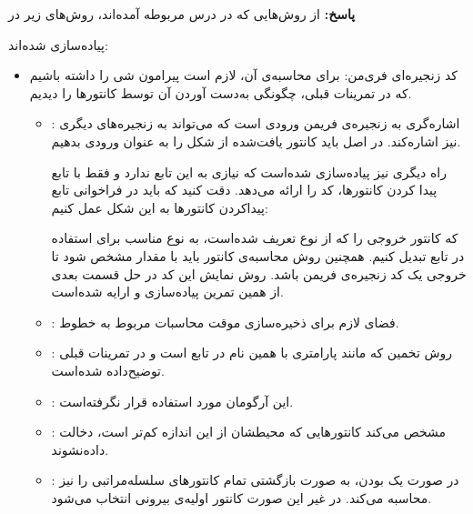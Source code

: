 \documentclass[12pt,a4paper]{article}
\theoremstyle{definition}
\theoremstyle{theorem}
\theoremstyle{definition}
\begin{document}
\textbf{پاسخ:}
از روش‌هایی که در درس مربوطه آمده‌اند، روش‌های زیر 
در 

پیاده‌سازی شده‌اند: 
\begin{itemize}
\renewcommand{\labelitemi}{$\bullet$}
\item 
کد زنجیره‌ای فری‌من: 
برای محاسبه‌ی آن، لازم است پیرامون شی را داشته باشیم که در تمرینات قبلی، چگونگی به‌دست آوردن آن توسط کانتورها را دیدیم. 




\begin{itemize}
\renewcommand{\labelitemii}{$\circ$}
\item
{} : 
اشاره‌گری به زنجیره‌ی فریمن ورودی است که می‌تواند به زنجیره‌های دیگری نیز اشاره‌کند. در اصل باید کانتور یافت‌شده از شکل را به عنوان ورودی بدهیم. 

راه دیگری نیز پیاده‌سازی شده‌است که نیازی به این تابع ندارد و فقط با تابع پیدا کردن کانتورها، کد را ارائه می‌دهد. دقت کنید که باید در فراخوانی تابع پیداکردن کانتورها به‌ این شکل عمل کنیم:


که کانتور خروجی  را که از نوع 
تعریف شده‌است، به نوع مناسب برای استفاده در تابع
 تبدیل کنیم. همچنین روش محاسبه‌ی کانتور باید با مقدار 
مشخص شود تا خروجی یک کد زنجیره‌ی فریمن باشد. روش نمایش این کد در حل قسمت بعدی از همین تمرین پیاده‌سازی و ارایه شده‌است.

\item
{} : 
فضای لازم برای ذخیره‌سازی موقت محاسبات مربوط به خطوط.

\item
{} :‌
روش تخمین که مانند پارامتری با همین نام در تابع 
است و در تمرینات قبلی توضیح‌داده شده‌است. 
\item
{} :‌
این آرگومان مورد استفاده قرار نگرفته‌است.

\item
{} :‌
مشخص می‌کند کانتورهایی که محیطشان از این اندازه کم‌تر است، دخالت‌ داده‌نشوند.

\item
{} :‌
در صورت یک بودن، به صورت بازگشتی تمام کانتورهای سلسله‌مراتبی را نیز محاسبه می‌کند. در غیر این صورت کانتور اولیه‌ی بیرونی انتخاب می‌شود.


\end{itemize}
\end{itemize}
\end{document}
